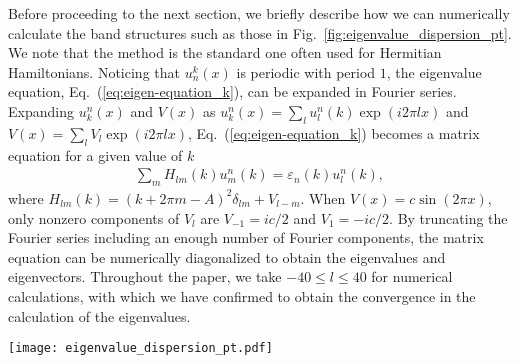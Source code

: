 \documentclass[prb,superscriptaddress,floatfix,twocolumn,showpacs]{revtex4-2}
\begin{document}
Before proceeding to the next section, we briefly describe how we can numerically calculate the band structures such as those in Fig.~\ref{fig:eigenvalue_dispersion_pt}. 
We note that the method is the standard one often used for Hermitian Hamiltonians.
Noticing that $u_n^k(x)$ is periodic with period $1$, the eigenvalue equation, Eq.~(\ref{eq:eigen-equation_k}), can be expanded in Fourier series. 
Expanding $u_k^n(x)$ and $V(x)$ as $u_k^n(x) = \sum_{l} u^n_l (k)\exp(i2\pi lx)$ and $V(x)=\sum_lV_l\exp(i2\pi lx)$, Eq.~(\ref{eq:eigen-equation_k}) becomes a matrix equation for a given value of $k$
\begin{align}
    \sum_m  H_{lm}(k) u^n_m (k) = \varepsilon_n(k) u_l^n(k),
    \label{eq:blochmatrix}
\end{align}
where $H_{lm}(k)=(k+2\pi m-A)^2\delta_{lm}+V_{l-m}$.
When $V(x) = c \sin (2\pi x)$, only nonzero components of $V_l$ are $V_{-1} = ic/2$ and $V_1 = -ic/2$.
By truncating the Fourier series including an enough number of Fourier components, the matrix equation can be numerically diagonalized to obtain the eigenvalues and eigenvectors. 
Throughout the paper, we take $-40\leq l \leq 40$ for numerical calculations, with which we have confirmed to obtain the convergence in the calculation of the eigenvalues.

\begin{figure*}
    \centering
    \texttt{[image: eigenvalue\_dispersion\_pt.pdf]}
    \caption{Eigenvalues in the complex plane and dispersion relations with $A=0$ and $V(x) = c \sin (2\pi x)$ (a) $c=0$, (b) $c=5i$, (c) $c=20i$, (d) $c=30i$, and (e) $c=80i$. 
    Green lines are obtained from the continuum model by solving Eq. (\ref{eq:eigen-equation_k}), and blue dashed lines in the center and bottom rows of (c)-(e) represent dispersion relations of first and second bands obtained from the bi-orthogonal tight-binding model discussed in Sec.~\ref{sec:tight-binding}. 
    In the bottom of (b)-(e), only Im$[\varepsilon_1(k)]$ and Im$[\varepsilon_2(k)]$ are shown but $\mathrm{Im}[\varepsilon_3(k)] = 0$ is not shown to avoid the figures becoming too crowded, while the third band is also shown in the top and center figures of (b)-(d). 
    In (d) and (e), Re$[\varepsilon_1(k)]$ and Re$[\varepsilon_2(k)]$ take the same value in the whole Brillouin zone.}
    \label{fig:eigenvalue_dispersion_pt}
\end{figure*}
\end{document}
